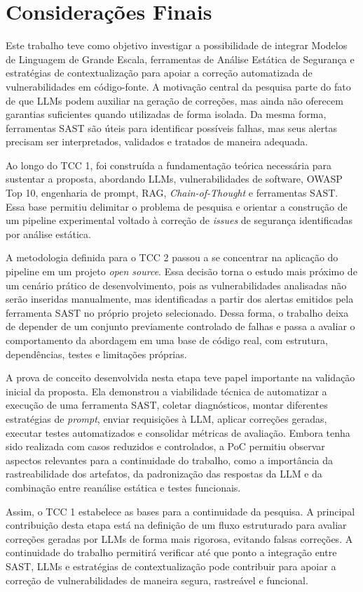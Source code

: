\chapter{Considerações Finais}

Este trabalho teve como objetivo investigar a possibilidade de integrar Modelos de Linguagem de Grande Escala, ferramentas de Análise Estática de Segurança e estratégias de contextualização para apoiar a correção automatizada de vulnerabilidades em código-fonte. A motivação central da pesquisa parte do fato de que LLMs podem auxiliar na geração de correções, mas ainda não oferecem garantias suficientes quando utilizadas de forma isolada. Da mesma forma, ferramentas SAST são úteis para identificar possíveis falhas, mas seus alertas precisam ser interpretados, validados e tratados de maneira adequada.

Ao longo do TCC 1, foi construída a fundamentação teórica necessária para sustentar a proposta, abordando LLMs, vulnerabilidades de software, OWASP Top 10, engenharia de prompt, RAG, \textit{Chain-of-Thought} e ferramentas SAST. Essa base permitiu delimitar o problema de pesquisa e orientar a construção de um pipeline experimental voltado à correção de \textit{issues} de segurança identificadas por análise estática.

A metodologia definida para o TCC 2 passou a se concentrar na aplicação do pipeline em um projeto \textit{open source}. Essa decisão torna o estudo mais próximo de um cenário prático de desenvolvimento, pois as vulnerabilidades analisadas não serão inseridas manualmente, mas identificadas a partir dos alertas emitidos pela ferramenta SAST no próprio projeto selecionado. Dessa forma, o trabalho deixa de depender de um conjunto previamente controlado de falhas e passa a avaliar o comportamento da abordagem em uma base de código real, com estrutura, dependências, testes e limitações próprias.

A prova de conceito desenvolvida nesta etapa teve papel importante na validação inicial da proposta. Ela demonstrou a viabilidade técnica de automatizar a execução de uma ferramenta SAST, coletar diagnósticos, montar diferentes estratégias de \textit{prompt}, enviar requisições à LLM, aplicar correções geradas, executar testes automatizados e consolidar métricas de avaliação. Embora tenha sido realizada com casos reduzidos e controlados, a PoC permitiu observar aspectos relevantes para a continuidade do trabalho, como a importância da rastreabilidade dos artefatos, da padronização das respostas da LLM e da combinação entre reanálise estática e testes funcionais.

Assim, o TCC 1 estabelece as bases para a continuidade da pesquisa. A principal contribuição desta etapa está na definição de um fluxo estruturado para avaliar correções geradas por LLMs de forma mais rigorosa, evitando falsas correções. A continuidade do trabalho permitirá verificar até que ponto a integração entre SAST, LLMs e estratégias de contextualização pode contribuir para apoiar a correção de vulnerabilidades de maneira segura, rastreável e funcional.